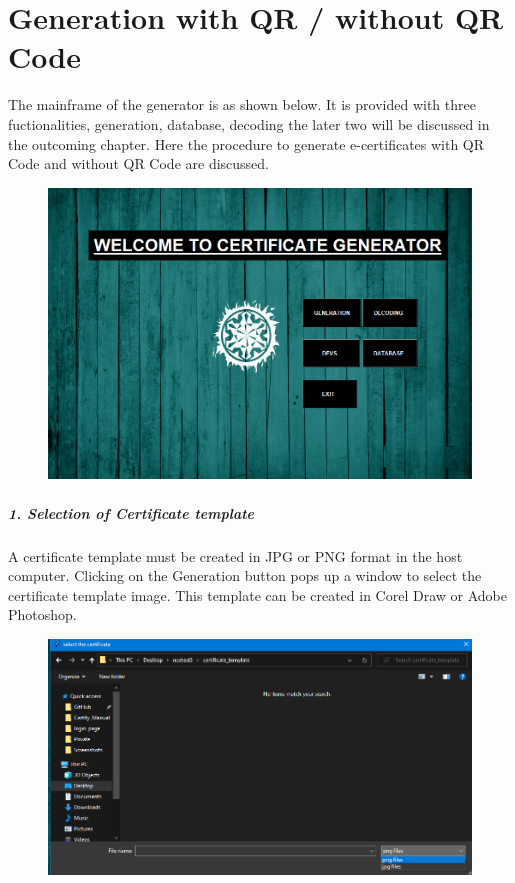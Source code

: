 \chapter{Generation with QR / without QR Code}

The mainframe of the generator is as shown below. It is provided with three fuctionalities, generation, database, decoding the later two will be discussed in the outcoming chapter. Here the procedure to generate e-certificates with QR Code and without QR Code are discussed.


\begin{figure}[H]
	\centering
	\includegraphics[width=0.75\linewidth]{"images/generation_qr_nqr/Screenshot (28)"}
	\label{fig:screenshot-28}
\end{figure}

\newpage
\paragraph{1. Selection of Certificate template}
A certificate template must be created in JPG or PNG format in the host computer. Clicking on the Generation button pops up a window to select the certificate template image. This template can be created in Corel Draw or Adobe Photoshop.

\begin{figure}[H]
	\centering
	\includegraphics[width=0.85\linewidth]{"images/generation_qr_nqr/Screenshot (29)"}
	\label{fig:screenshot-29}
\end{figure}


